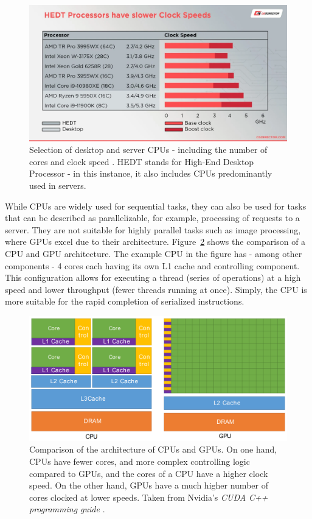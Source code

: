 \begin{figure}[ht!]
	\centering
	\includegraphics[width=14cm, keepaspectratio]{images/ch1/processors_comparison.png}
	\caption{Selection of desktop and server CPUs - including the number of cores and clock speed \cite{Glawion7March2022}. HEDT stands for High-End Desktop Processor - in this instance, it also includes CPUs predominantly used in servers.}
	\label{Figure:theory-GPUs-GPGPU-processor-comparison}
\end{figure}

While CPUs are widely used for sequential tasks, they can also be used for tasks that can be described as parallelizable, for example, processing of requests to a server. They are not suitable for highly parallel tasks such as image processing, where GPUs excel due to their architecture. Figure~\ref{Figure:theory-GPUs-GPGPU-nvidia-CPU-GPU-architecture-comparison} shows the comparison of a CPU and GPU architecture. The example CPU in the figure has - among other components - 4 cores each having its own L1 cache and controlling component. This configuration allows for executing a thread (series of operations) at a high speed and lower throughput (fewer threads running at once). Simply, the CPU is more suitable for the rapid completion of serialized instructions.

\begin{figure}[ht!]
	\centering
	\includegraphics[width=14cm, keepaspectratio]{images/ch1/nvidia_CPU_GPU_comparison.png}
	\caption{Comparison of the architecture of CPUs and GPUs. On one hand, CPUs have fewer cores, and more complex controlling logic compared to GPUs, and the cores of a CPU have a higher clock speed. On the other hand, GPUs have a much higher number of cores clocked at lower speeds. Taken from Nvidia's \emph{CUDA C++ programming guide} \cite{NVIDIAMay2022}.}
	\label{Figure:theory-GPUs-GPGPU-nvidia-CPU-GPU-architecture-comparison}
\end{figure}

